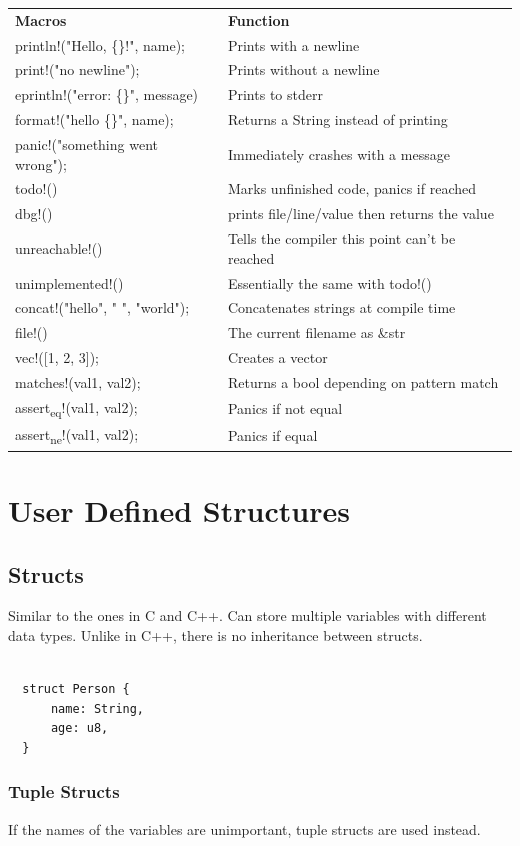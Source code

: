 \documentclass[11pt]{article}
\begin{document}
\begin{center}
\begin{tabular}{ll}
\textbf{Macros} & \textbf{Function}\\
println!("Hello, \{\}!", name); & Prints with a newline\\
print!("no newline"); & Prints without a newline\\
eprintln!("error: \{\}", message) & Prints to stderr\\
format!("hello \{\}", name); & Returns a String instead of printing\\
panic!("something went wrong"); & Immediately crashes with a message\\
todo!() & Marks unfinished code, panics if reached\\
dbg!() & prints file/line/value then returns the value\\
unreachable!() & Tells the compiler this point can't be reached\\
unimplemented!() & Essentially the same with todo!()\\
concat!("hello", " ", "world"); & Concatenates strings at compile time\\
file!() & The current filename as \&str\\
vec!([1, 2, 3]); & Creates a vector\\
matches!(val1, val2); & Returns a bool depending on pattern match\\
assert\textsubscript{eq}!(val1, val2); & Panics if not equal\\
assert\textsubscript{ne}!(val1, val2); & Panics if equal\\
\end{tabular}
\end{center}
\section{User Defined Structures}
\label{sec:orgca27108}
\subsection{Structs}
\label{sec:org5bf9d12}
Similar to the ones in C and C++. Can store multiple variables with different data types.
Unlike in C++, there is no inheritance between structs.

\begin{verbatim}

  struct Person {
      name: String,
      age: u8,
  }
\end{verbatim}
\subsubsection{Tuple Structs}
\label{sec:orge27a025}
If the names of the variables are unimportant, tuple structs are used instead.
\end{document}
